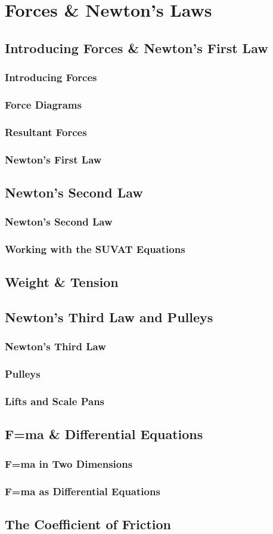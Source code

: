 \documentclass[../alevelmaths.tex]{subfiles}
\begin{document}
\chapter{Forces \& Newton's Laws}
\section{Introducing Forces \& Newton's First Law}
\subsection*{Introducing Forces}
\subsection*{Force Diagrams}
\subsection*{Resultant Forces}
\subsection*{Newton's First Law}
\section{Newton's Second Law}
\subsection*{Newton's Second Law}
\subsection*{Working with the SUVAT Equations}
\section{Weight \& Tension}
\section{Newton's Third Law and Pulleys}
\subsection*{Newton's Third Law}
\subsection*{Pulleys}
\subsection*{Lifts and Scale Pans}
\section{F=ma \& Differential Equations}
\subsection*{F=ma in Two Dimensions}
\subsection*{F=ma as Differential Equations}
\section{The Coefficient of Friction}
\end{document}
